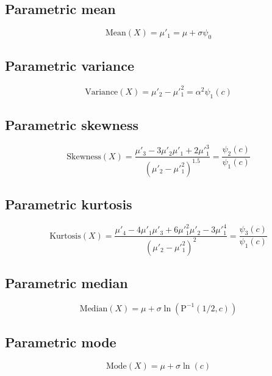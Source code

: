 \documentclass{article}
\begin{document}
\subsection{Parametric mean}
\begin{equation*} \mathrm{Mean}(X)=\mu'_{1}=\mu+\sigma\psi_{0} \end{equation*}
\subsection{Parametric variance}
\begin{equation*} \mathrm{Variance}(X)=\mu'_{2}-\mu'^{2}_{1}=\alpha^{2}\psi_{1}\left(c\right) \end{equation*}
\subsection{Parametric skewness}
\begin{equation*} \mathrm{Skewness}(X)=\frac{\mu'_{3}-3\mu'_{2}\mu'_{1}+2\mu'^{3}_{1}}{(\mu'_{2}-\mu'^{2}_{1})^{1.5}}=\frac{\psi_{2}\left(c\right)}{\psi_{1}\left(c\right)} \end{equation*}
\subsection{Parametric kurtosis}
\begin{equation*} \mathrm{Kurtosis}(X)=\frac{\mu'_{4}-4\mu'_{1}\mu'_{3}+6\mu'^{2}_{1}\mu'_{2}-3\mu'^{4}_{1}}{(\mu'_{2}-\mu'^{2}_{1})^{2}}=\frac{\psi_{3}\left(c\right)}{\psi_{1}\left(c\right)} \end{equation*}
\subsection{Parametric median}
\begin{equation*} \mathrm{Median}(X)=\mu+\sigma\ln\left(\text{P}^{-1}\left(1/2,c\right)\right) \end{equation*}
\subsection{Parametric mode}
\begin{equation*} \mathrm{Mode}(X)=\mu+\sigma\ln(c) \end{equation*}
\end{document}
